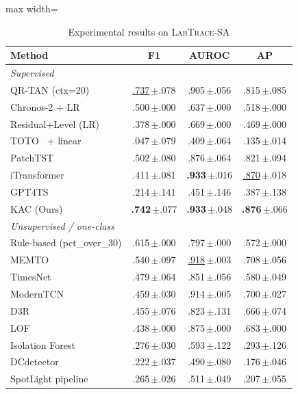 \documentclass[conference]{IEEEtran}
\newcommand{\sd}[1]{\,{\fontsize{6pt}{7pt}\selectfont $\pm$#1}}
\begin{document}
\begin{table}[!htbp]
  \centering
  \caption{Experimental results on \textsc{LabTrace-SA}}
  \label{tab:production_benchmark}
  \small
  \setlength{\tabcolsep}{3pt}
  \begin{adjustbox}{max width=\columnwidth}
  \begin{tabular}{@{}lccc@{}}
    \toprule
    \textbf{Method} & \textbf{F1} & \textbf{AUROC} & \textbf{AP} \\
    \midrule
    \multicolumn{4}{l}{\emph{Supervised}} \\
    QR-TAN (ctx=20)                      & \underline{.737}\sd{.078} & .905\sd{.056} & .815\sd{.085} \\
    Chronos-2 + LR                       & .500\sd{.000} & .637\sd{.000} & .518\sd{.000} \\
    Residual+Level (LR)                  & .378\sd{.000} & .669\sd{.000} & .469\sd{.000} \\
    TOTO~\cite{cohen2025toto} + linear           & .047\sd{.079}  & .409\sd{.064}  & .135\sd{.014} \\
    PatchTST~\cite{nie2023patchtst}      & .502\sd{.080} & .876\sd{.064} & .821\sd{.094} \\
    iTransformer~\cite{liu2024itransformer} & .411\sd{.081} & \textbf{.933}\sd{.016} & \underline{.870}\sd{.018} \\
    GPT4TS~\cite{zhou2023gpt4ts}         & .214\sd{.141} & .451\sd{.146} & .387\sd{.138} \\
    KAC (Ours)                           & \textbf{.742}\sd{.077} & \textbf{.933}\sd{.048} & \textbf{.876}\sd{.066} \\
    \midrule
    \multicolumn{4}{l}{\emph{Unsupervised / one-class}} \\
    Rule-based (pct\_over\_30)           & .615\sd{.000} & .797\sd{.000} & .572\sd{.000} \\
    MEMTO~\cite{song2023memto}           & .540\sd{.097} & \underline{.918}\sd{.003} & .708\sd{.056} \\
    TimesNet~\cite{wu2023timesnet}       & .479\sd{.064} & .851\sd{.056} & .580\sd{.049} \\
    ModernTCN~\cite{luo2024moderntcn}    & .459\sd{.030} & .914\sd{.005} & .700\sd{.027} \\
    D3R~\cite{wang2023d3r}               & .455\sd{.076} & .823\sd{.131} & .666\sd{.074} \\
    LOF                                  & .438\sd{.000} & .875\sd{.000} & .683\sd{.000} \\
    Isolation Forest                     & .276\sd{.030} & .593\sd{.122} & .293\sd{.126} \\
    DCdetector~\cite{yang2023dcdetector} & .222\sd{.037} & .490\sd{.080} & .176\sd{.046} \\
    SpotLight pipeline~\cite{sun2024spotlight} & .265\sd{.026} & .511\sd{.049} & .207\sd{.055} \\
    \bottomrule
  \end{tabular}
  \end{adjustbox}
\end{table}
\end{document}
